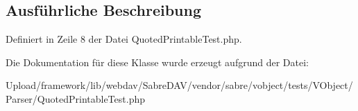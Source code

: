 \subsection{Ausführliche Beschreibung}


Definiert in Zeile 8 der Datei Quoted\+Printable\+Test.\+php.



Die Dokumentation für diese Klasse wurde erzeugt aufgrund der Datei\+:\begin{DoxyCompactItemize}
\item 
Upload/framework/lib/webdav/\+Sabre\+D\+A\+V/vendor/sabre/vobject/tests/\+V\+Object/\+Parser/Quoted\+Printable\+Test.\+php\end{DoxyCompactItemize}
